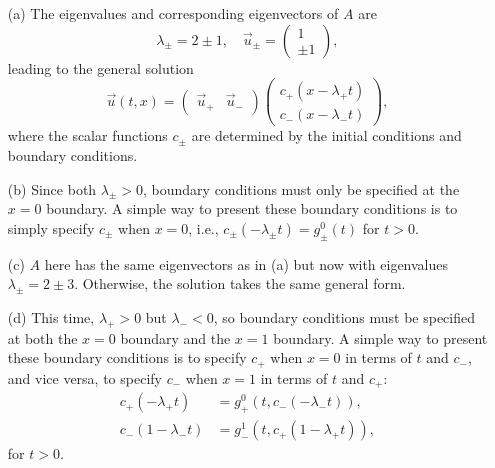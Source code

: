 \documentclass{article}
\begin{document}
\begin{itemize}
\begin{itemize}
\item[(a)] The eigenvalues and corresponding eigenvectors of $A$ are
\begin{equation*}
\lambda_{\pm} = 2 \pm 1, \quad \vec{u}_{\pm} = \begin{pmatrix} 1 \\ \pm 1 \end{pmatrix},
\end{equation*}
leading to the general solution
\begin{equation*}
\vec{u}(t,x) = \begin{pmatrix} \vec{u}_+ & \vec{u}_- \end{pmatrix} \begin{pmatrix} c_+ \left( x - \lambda_+ t \right) \\ c_- \left( x - \lambda_- t \right) \end{pmatrix},
\end{equation*}
where the scalar functions $c_{\pm}$ are determined by the initial conditions and boundary conditions.
\item[(b)] Since both $\lambda_{\pm} > 0$, boundary conditions must only be specified at the $x = 0$ boundary. A simple way to present these boundary conditions is to simply specify $c_{\pm}$ when $x = 0$, i.e., $c_{\pm} \left( -\lambda_{\pm} t \right) = g^0_{\pm}(t)$ for $t > 0$.
\item[(c)] $A$ here has the same eigenvectors as in (a) but now with eigenvalues $\lambda_{\pm} = 2 \pm 3$. Otherwise, the solution takes the same general form.
\item[(d)] This time, $\lambda_+ > 0$ but $\lambda_- < 0$, so boundary conditions must be specified at both the $x = 0$ boundary and the $x = 1$ boundary. A simple way to present these boundary conditions is to specify $c_+$ when $x = 0$ in terms of $t$ and $c_-$, and vice versa, to specify $c_-$ when $x = 1$ in terms of $t$ and $c_+$:
\begin{align*}
c_+ \left( -\lambda_+ t \right) & = g^0_+ \left( t, c_- \left( -\lambda_- t \right) \right), \\
c_- \left( 1 - \lambda_- t \right) & = g^1_- \left( t, c_+ \left( 1 - \lambda_+ t \right) \right),
\end{align*}
for $t > 0$.

\end{itemize}


\end{itemize}
\end{document}
